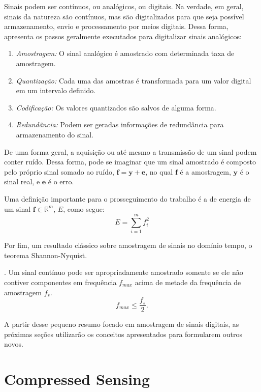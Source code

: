 \documentclass[cic,tc]{iiufrgs}
\renewcommand{\vec}[1]{\bm{#1}}
\begin{document}
Sinais podem ser contínuos, ou analógicos, ou digitais.
Na verdade, em geral, sinais da natureza são contínuos, mas são digitalizados 
para que seja possível armazenamento, envio e processamento por meios digitais.
Dessa forma, \citet{haykin2001sinais} apresenta os passos geralmente executados 
para digitalizar sinais analógicos:
\begin{enumerate}
    \item \emph{Amostragem:} O sinal analógico é amostrado com determinada taxa de amostragem.
    \item \emph{Quantização:} Cada uma das amostras é transformada para um valor digital em um intervalo definido.
    \item \emph{Codificação:} Os valores quantizados são salvos de alguma forma.
    \item \emph{Redundância:} Podem ser geradas informações de redundância para armazenamento do sinal.
\end{enumerate} 

De uma forma geral, a aquisição ou até mesmo a transmissão de um sinal podem conter ruído.
Dessa forma, pode se imaginar que um sinal amostrado é composto pelo próprio sinal somado ao ruído,
$\vec{f} = \vec{y} + \vec{e}$, no qual $\vec{f}$ é a amostragem, $\vec{y}$ é o sinal real, 
e $\vec{e}$ é o erro.


Uma definição importante para o prosseguimento do trabalho é a de energia de um sinal $\vec{f} \in \mathbb{R}^m$,
$E$, como segue:
\begin{equation}
    E = \sum_{i=1}^m f_i^2
\end{equation}

Por fim, um resultado clássico sobre amostragem de sinais no domínio tempo, o teorema Shannon-Nyquist.
\begin{teorema}
    \cite{NyquistSampling}.
    Um sinal contínuo pode ser apropriadamente amostrado somente se ele não contiver 
    componentes em frequência $f_{max}$ acima de metade da frequência de amostragem $f_s$.
    \begin{equation*}
        f_{max} \le \frac{f_s}{2}.
    \end{equation*}
\end{teorema}

A partir desse pequeno resumo focado em amostragem de sinais digitais,
as próximas seções utilizarão os conceitos apresentados para formularem outros novos.

\section{Compressed Sensing}
\end{document}
